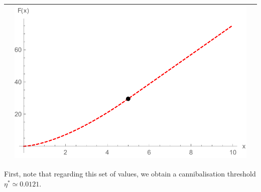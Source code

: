 \begin{table}[!htb]
\begin{tabular}{c|c|c}
\begin{minipage}{.4\textwidth}
		\end{minipage}
		& \begin{minipage}{.4\textwidth}
			\includegraphics[width=\linewidth]{Prob3/eta013dash.pdf}
		\end{minipage} \\ \hline
	\end{tabular}
	\label{fig:3_F}
\end{table}


First, note that regarding this set of values, we obtain a cannibalisation threshold $\eta^*\simeq 0.0121$. 

